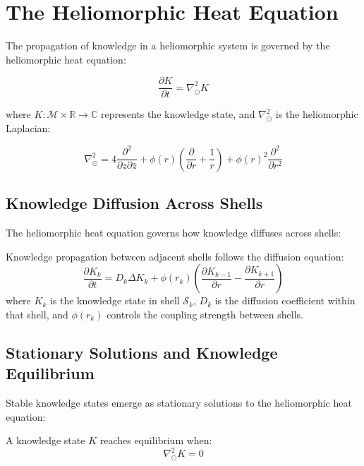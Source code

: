 \section{The Heliomorphic Heat Equation}

The propagation of knowledge in a heliomorphic system is governed by the heliomorphic heat equation:

\begin{equation}
\frac{\partial K}{\partial t} = \nabla_{\odot}^2 K
\end{equation}

where $K: \mathcal{M} \times \mathbb{R} \rightarrow \mathbb{C}$ represents the knowledge state, and $\nabla_{\odot}^2$ is the heliomorphic Laplacian:

\begin{equation}
\nabla_{\odot}^2 = 4\frac{\partial^2}{\partial z \partial \bar{z}} + \phi(r)\left(\frac{\partial}{\partial r} + \frac{1}{r}\right) + \phi(r)^2\frac{\partial^2}{\partial r^2}
\end{equation}

\subsection{Knowledge Diffusion Across Shells}

The heliomorphic heat equation governs how knowledge diffuses across shells:

\begin{theorem}
Knowledge propagation between adjacent shells follows the diffusion equation:
\begin{equation}
\frac{\partial K_k}{\partial t} = D_k \Delta K_k + \phi(r_k) \left(\frac{\partial K_{k-1}}{\partial r} - \frac{\partial K_{k+1}}{\partial r}\right)
\end{equation}
where $K_k$ is the knowledge state in shell $\mathcal{S}_k$, $D_k$ is the diffusion coefficient within that shell, and $\phi(r_k)$ controls the coupling strength between shells.
\end{theorem}

\subsection{Stationary Solutions and Knowledge Equilibrium}

Stable knowledge states emerge as stationary solutions to the heliomorphic heat equation:

\begin{theorem}
A knowledge state $K$ reaches equilibrium when:
\begin{equation}
\nabla_{\odot}^2 K = 0
\end{equation}
\end{theorem}

